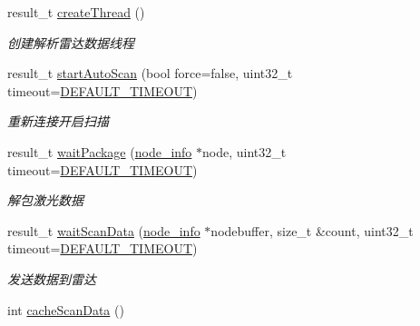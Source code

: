 \begin{DoxyCompactItemize}
\item 
result\+\_\+t \hyperlink{classydlidar_1_1_y_dlidar_driver_a2d2b317fa6381009222e03670812e917}{create\+Thread} ()
\begin{DoxyCompactList}\small\item\em 创建解析雷达数据线程 ~\newline
\end{DoxyCompactList}\item 
result\+\_\+t \hyperlink{classydlidar_1_1_y_dlidar_driver_a75b64716b6c354f814d0b423404e4104}{start\+Auto\+Scan} (bool force=false, uint32\+\_\+t timeout=\hyperlink{classydlidar_1_1_y_dlidar_driver_a13a4f2dc4067b43794b2c47c06d5d27aa07c79ce96f468ff4b40495ef84584442}{D\+E\+F\+A\+U\+L\+T\+\_\+\+T\+I\+M\+E\+O\+UT})
\begin{DoxyCompactList}\small\item\em 重新连接开启扫描 ~\newline
\end{DoxyCompactList}\item 
result\+\_\+t \hyperlink{classydlidar_1_1_y_dlidar_driver_aaf78903693f58c7f739dfa493573b3b1}{wait\+Package} (\hyperlink{structnode__info}{node\+\_\+info} $\ast$node, uint32\+\_\+t timeout=\hyperlink{classydlidar_1_1_y_dlidar_driver_a13a4f2dc4067b43794b2c47c06d5d27aa07c79ce96f468ff4b40495ef84584442}{D\+E\+F\+A\+U\+L\+T\+\_\+\+T\+I\+M\+E\+O\+UT})
\begin{DoxyCompactList}\small\item\em 解包激光数据 ~\newline
\end{DoxyCompactList}\item 
result\+\_\+t \hyperlink{classydlidar_1_1_y_dlidar_driver_a574996217284ce34191a2f3675a9f17b}{wait\+Scan\+Data} (\hyperlink{structnode__info}{node\+\_\+info} $\ast$nodebuffer, size\+\_\+t \&count, uint32\+\_\+t timeout=\hyperlink{classydlidar_1_1_y_dlidar_driver_a13a4f2dc4067b43794b2c47c06d5d27aa07c79ce96f468ff4b40495ef84584442}{D\+E\+F\+A\+U\+L\+T\+\_\+\+T\+I\+M\+E\+O\+UT})
\begin{DoxyCompactList}\small\item\em 发送数据到雷达 ~\newline
\end{DoxyCompactList}\item 
int \hyperlink{classydlidar_1_1_y_dlidar_driver_ab462b22dc3a4d39fef4f722345a87d5e}{cache\+Scan\+Data} ()\hypertarget{classydlidar_1_1_y_dlidar_driver_ab462b22dc3a4d39fef4f722345a87d5e}{}\label{classydlidar_1_1_y_dlidar_driver_ab462b22dc3a4d39fef4f722345a87d5e}


\end{DoxyCompactItemize}
